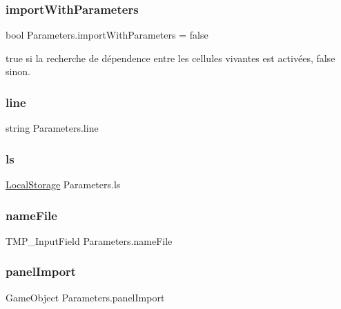 \subsubsection{\texorpdfstring{import\+With\+Parameters}{importWithParameters}}
{\footnotesize\ttfamily bool Parameters.\+import\+With\+Parameters = false}



true si la recherche de dépendence entre les cellules vivantes est activées, false sinon. 

\mbox{\label{class_parameters_a978bf381c1fd3f17e4289f182b7d647b}} 
\subsubsection{\texorpdfstring{line}{line}}
{\footnotesize\ttfamily string Parameters.\+line}

\mbox{\label{class_parameters_ab63c98cfc7508243010978c7c4d515a5}} 
\subsubsection{\texorpdfstring{ls}{ls}}
{\footnotesize\ttfamily \mbox{\hyperlink{class_local_storage}{Local\+Storage}} Parameters.\+ls}

\mbox{\label{class_parameters_a70300043b336ebaf786ae92efe9d215f}} 
\subsubsection{\texorpdfstring{name\+File}{nameFile}}
{\footnotesize\ttfamily T\+M\+P\+\_\+\+Input\+Field Parameters.\+name\+File}

\mbox{\label{class_parameters_a9039782e9b57b1cca98f109c8bd22928}} 
\subsubsection{\texorpdfstring{panel\+Import}{panelImport}}
{\footnotesize\ttfamily Game\+Object Parameters.\+panel\+Import}

